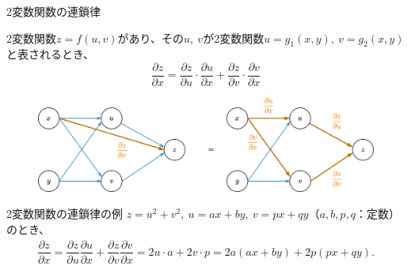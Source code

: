 \documentclass[dvipdfmx,aspectratio=169]{beamer}
\begin{document}
	\begin{frame}{2変数関数の連鎖律}
		\begin{screen}
			2変数関数$ z = f(u,v) $があり、その$ u,\ v $が2変数関数$ u = g_1(x,y),\ v = g_2(x,y) $と表されるとき、
			\begin{equation*}
				\dfrac{\partial z}{\partial x} = \dfrac{\partial z}{\partial u}\cdot\dfrac{\partial u}{\partial x} + \dfrac{\partial z}{\partial v}\cdot\dfrac{\partial v}{\partial x}
			\end{equation*}
		\end{screen}
		\begin{figure}
			\centering
			\includegraphics[width=0.8\linewidth]{img/chain-rule-of-multivariable-functions}
		\end{figure}
	\end{frame}
	\begin{frame}{2変数関数の連鎖律の例}
		$ z=u^2+v^2,\ u=ax+by,\ v=px+qy $（$ a, b, p, q $：定数）のとき、
		\begin{align*}
			\dfrac{\partial z}{\partial x} = \dfrac{\partial z}{\partial u}\dfrac{\partial u}{\partial x} + \dfrac{\partial z}{\partial v}\dfrac{\partial v}{\partial x} = 2u \cdot a + 2v \cdot p = 2a(ax+by) + 2p(px+qy).
		\end{align*}
	\end{frame}
	
\end{document}
